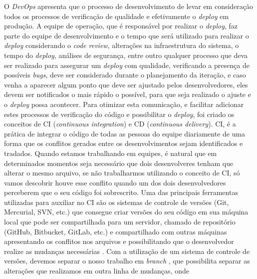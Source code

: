       O \textit{DevOps} apresenta que o processo de desenvolvimento de levar em
      consideração todos os processos de verificação de qualidade e efetivamente
      o \textit{deploy} em produção. A equipe de operação, que é responsável por
      realizar o \textit{deploy}, faz parte do equipe de desenvolvimento e o tempo
      que será utilizado para realizar o \textit{deploy} considerando o
      \textit{code review}, alterações na infraestrutura do sistema, o tempo do
      \textit{deploy}, análises de segurança, entre outro qualquer processo que
      deva ser realizado para assegurar um \textit{deploy} com qualidade, verificando
      a presença de possíveis \textit{bugs}, deve ser considerado durante o
      planejamento da iteração, e caso venha a aparecer algum ponto que deve ser
      ajustado pelos desenvolvedores, eles devem ser notificados o mais rápido o
      possível, para que seja realizado o ajuste e o \textit{deploy} possa acontecer. \newline
      Para otimizar esta comunicação, e facilitar adicionar estes processos de
      verificação do código e possibilitar o \textit{deploy}, foi criado os
      conceitos de CI (\textit{continuous integration}) e CD
      (\textit{continuous delivery}). \newline
      CI, é a prática de integrar o código de todas as pessoas do equipe diariamente
      de uma forma que os conflitos gerados entre os desenvolvimentos sejam
      identificados e tradados. Quando estamos trabalhando em equipes, é natural
      que em determinados momentos seja necessário que dois desenvolveres tenham
      que alterar o mesmo arquivo, se não trabalharmos utilizando o conceito de
      CI, só vamos descobrir houve esse conflito quando um dos dois desenvolvedores
      perceberem que o seu código foi sobrescrito. Uma das principais ferramentas
      utilizadas para auxiliar no CI são os sistemas de controle de versões
      (Git, Mercurial, SVN, etc.) que consegue criar versões do seu
      código em sua máquina local que pode ser compartilhada para um servidor,
      chamado de repositório (GitHub, Bitbucket, GitLab, etc.) e compartilhado
      com outras máquinas apresentando os conflitos nos arquivos e possibilitando
      que o desenvolvedor realize as mudanças necessárias \cite{ProGit}. \newline
      Com a utilização de um sistema de controle de versões, devemos separar o
      nosso trabalho em \textit{branch} \cite{TheDevOpsHandbook}, que possibilita
      separar as alterações que realizamos em outra linha de mudanças, onde
